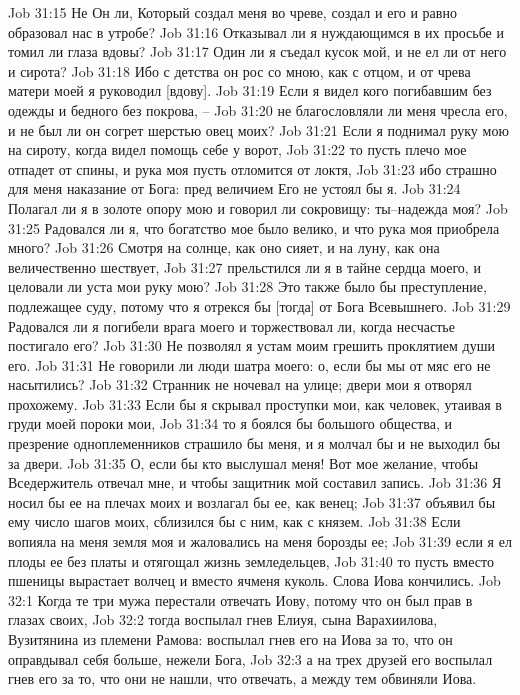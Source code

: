 Job 31:15  Не Он ли, Который создал меня во чреве, создал и его и равно образовал нас в утробе?
Job 31:16  Отказывал ли я нуждающимся в их просьбе и томил ли глаза вдовы?
Job 31:17  Один ли я съедал кусок мой, и не ел ли от него и сирота?
Job 31:18  Ибо с детства он рос со мною, как с отцом, и от чрева матери моей я руководил [вдову].
Job 31:19  Если я видел кого погибавшим без одежды и бедного без покрова, --
Job 31:20  не благословляли ли меня чресла его, и не был ли он согрет шерстью овец моих?
Job 31:21  Если я поднимал руку мою на сироту, когда видел помощь себе у ворот,
Job 31:22  то пусть плечо мое отпадет от спины, и рука моя пусть отломится от локтя,
Job 31:23  ибо страшно для меня наказание от Бога: пред величием Его не устоял бы я.
Job 31:24  Полагал ли я в золоте опору мою и говорил ли сокровищу: ты--надежда моя?
Job 31:25  Радовался ли я, что богатство мое было велико, и что рука моя приобрела много?
Job 31:26  Смотря на солнце, как оно сияет, и на луну, как она величественно шествует,
Job 31:27  прельстился ли я в тайне сердца моего, и целовали ли уста мои руку мою?
Job 31:28  Это также было бы преступление, подлежащее суду, потому что я отрекся бы [тогда] от Бога Всевышнего.
Job 31:29  Радовался ли я погибели врага моего и торжествовал ли, когда несчастье постигало его?
Job 31:30  Не позволял я устам моим грешить проклятием души его.
Job 31:31  Не говорили ли люди шатра моего: о, если бы мы от мяс его не насытились?
Job 31:32  Странник не ночевал на улице; двери мои я отворял прохожему.
Job 31:33  Если бы я скрывал проступки мои, как человек, утаивая в груди моей пороки мои,
Job 31:34  то я боялся бы большого общества, и презрение одноплеменников страшило бы меня, и я молчал бы и не выходил бы за двери.
Job 31:35  О, если бы кто выслушал меня! Вот мое желание, чтобы Вседержитель отвечал мне, и чтобы защитник мой составил запись.
Job 31:36  Я носил бы ее на плечах моих и возлагал бы ее, как венец;
Job 31:37  объявил бы ему число шагов моих, сблизился бы с ним, как с князем.
Job 31:38  Если вопияла на меня земля моя и жаловались на меня борозды ее;
Job 31:39  если я ел плоды ее без платы и отягощал жизнь земледельцев,
Job 31:40  то пусть вместо пшеницы вырастает волчец и вместо ячменя куколь. Слова Иова кончились.
Job 32:1  Когда те три мужа перестали отвечать Иову, потому что он был прав в глазах своих,
Job 32:2  тогда воспылал гнев Елиуя, сына Варахиилова, Вузитянина из племени Рамова: воспылал гнев его на Иова за то, что он оправдывал себя больше, нежели Бога,
Job 32:3  а на трех друзей его воспылал гнев его за то, что они не нашли, что отвечать, а между тем обвиняли Иова.
